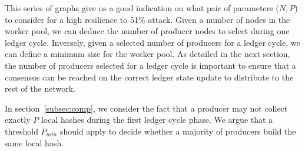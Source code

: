 This series of graphs give us a good indication on what pair of parameters ($N,P$) to consider for a high resilience to 51\% attack. Given a number of nodes in the worker pool, we can deduce the number of producer nodes to select during one ledger cycle. Inversely, given a selected number of producers for a ledger cycle, we can define a minimum size for the worker pool. As detailed in the next section, the number of producers selected for a ledger cycle is important to ensure that a consensus can be reached on the correct ledger state update to distribute to the rest of the network.

In section~\ref{subsec:comp}, we consider the fact that a producer may not collect exactly $P$ local hashes during the first ledger cycle phase. We argue that a threshold $P_{min}$ should apply to decide whether a majority of producers build the same local hash. 
